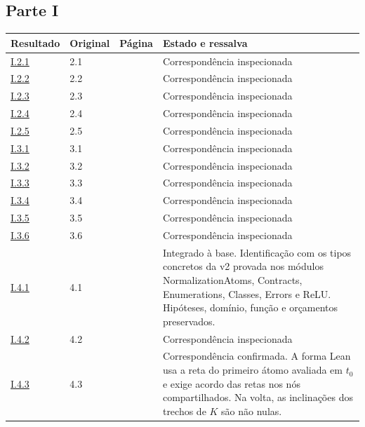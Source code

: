 \documentclass[12pt,a4paper]{article}
\theoremstyle{preciso}
\theoremstyle{definition}
\theoremstyle{preciso}
\theoremstyle{preciso}
\theoremstyle{preciso}
\theoremstyle{preciso}
\theoremstyle{definition}
\theoremstyle{preciso}
\theoremstyle{definition}
\theoremstyle{preciso}
\theoremstyle{preciso}
\theoremstyle{definition}
\begin{document}
\begin{singlespace}
\subsection*{Parte I}
\small
\begin{longtable}{@{}p{.11\linewidth}p{.09\linewidth}p{.09\linewidth}p{.59\linewidth}@{}}
\toprule Resultado & Original & Página & Estado e ressalva\\\midrule\endhead
\hyperref[map:artigo_1:2.1]{I.2.1} & 2.1 & \pageref{map:artigo_1:2.1} & Correspondência inspecionada\\[4pt]
\hyperref[map:artigo_1:2.2]{I.2.2} & 2.2 & \pageref{map:artigo_1:2.2} & Correspondência inspecionada\\[4pt]
\hyperref[map:artigo_1:2.3]{I.2.3} & 2.3 & \pageref{map:artigo_1:2.3} & Correspondência inspecionada\\[4pt]
\hyperref[map:artigo_1:2.4]{I.2.4} & 2.4 & \pageref{map:artigo_1:2.4} & Correspondência inspecionada\\[4pt]
\hyperref[map:artigo_1:2.5]{I.2.5} & 2.5 & \pageref{map:artigo_1:2.5} & Correspondência inspecionada\\[4pt]
\hyperref[map:artigo_1:3.1]{I.3.1} & 3.1 & \pageref{map:artigo_1:3.1} & Correspondência inspecionada\\[4pt]
\hyperref[map:artigo_1:3.2]{I.3.2} & 3.2 & \pageref{map:artigo_1:3.2} & Correspondência inspecionada\\[4pt]
\hyperref[map:artigo_1:3.3]{I.3.3} & 3.3 & \pageref{map:artigo_1:3.3} & Correspondência inspecionada\\[4pt]
\hyperref[map:artigo_1:3.4]{I.3.4} & 3.4 & \pageref{map:artigo_1:3.4} & Correspondência inspecionada\\[4pt]
\hyperref[map:artigo_1:3.5]{I.3.5} & 3.5 & \pageref{map:artigo_1:3.5} & Correspondência inspecionada\\[4pt]
\hyperref[map:artigo_1:3.6]{I.3.6} & 3.6 & \pageref{map:artigo_1:3.6} & Correspondência inspecionada\\[4pt]
\hyperref[map:artigo_1:4.1]{I.4.1} & 4.1 & \pageref{map:artigo_1:4.1} & Integrado à base. Identificação com os tipos concretos da v2 provada nos módulos NormalizationAtoms, Contracts, Enumerations, Classes, Errors e ReLU. Hipóteses, domínio, função e orçamentos preservados.\\[4pt]
\hyperref[map:artigo_1:4.2]{I.4.2} & 4.2 & \pageref{map:artigo_1:4.2} & Correspondência inspecionada\\[4pt]
\hyperref[map:artigo_1:4.3]{I.4.3} & 4.3 & \pageref{map:artigo_1:4.3} & Correspondência confirmada. A forma Lean usa a reta do primeiro átomo avaliada em $t_0$ e exige acordo das retas nos nós compartilhados. Na volta, as inclinações dos trechos de $K$ são não nulas.\\[4pt]

\end{longtable}
\end{singlespace}
\end{document}
